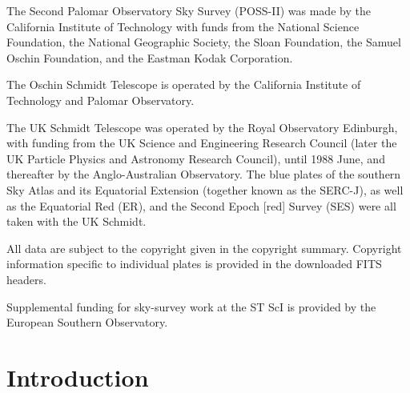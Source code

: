 \documentclass[12pt,oneside,letterpaper]{report}
\begin{document}
The Second Palomar Observatory Sky Survey (POSS-II) was made by the California Institute of Technology with funds from the National Science Foundation, the National Geographic Society, the Sloan Foundation, the Samuel Oschin Foundation, and the Eastman Kodak Corporation.

The Oschin Schmidt Telescope is operated by the California Institute of Technology and Palomar Observatory.

The UK Schmidt Telescope was operated by the Royal Observatory Edinburgh, with funding from the UK Science and Engineering Research Council (later the UK Particle Physics and Astronomy Research Council), until 1988 June, and thereafter by the Anglo-Australian Observatory. The blue plates of the southern Sky Atlas and its Equatorial Extension (together known as the SERC-J), as well as the Equatorial Red (ER), and the Second Epoch [red] Survey (SES) were all taken with the UK Schmidt.

All data are subject to the copyright given in the copyright summary. Copyright information specific to individual plates is provided in the downloaded FITS headers.

Supplemental funding for sky-survey work at the ST ScI is provided by the European Southern Observatory.





\tableofcontents
\listoffigures
\listoftables

%
%
%
%
%
%
%
%
\newpage






\chapter{Introduction}\label{sec:introduction}

\end{document}
